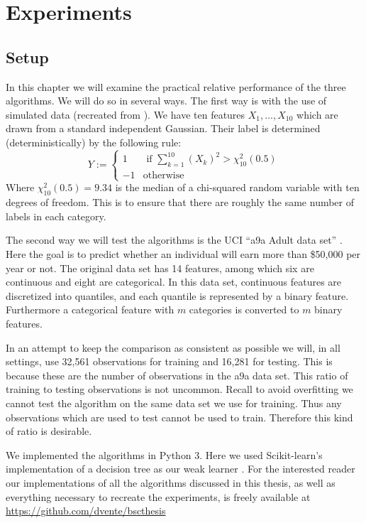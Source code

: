 
\chapter{Experiments}
\label{chap:pracPerf}
\section{Setup}
\label{sec:Setup}
In this chapter we will examine the practical relative performance of the three algorithms. We will do so in several ways. The first way is with the use of simulated data (recreated from \cite{Hastie2009}). We have ten features $X_1,\ldots,X_{10}$ which are drawn from a standard independent Gaussian. Their label is determined (deterministically) by the following rule: $$Y:=\begin{cases}
1 & \text{ if } \sum_{k=1}^{10} (X_k)^2 > \chi_{10}^2(0.5)\\
-1 & \text{otherwise}
\end{cases}$$ Where $\chi_{10}^2(0.5)=9.34$ is the median of a chi-squared random variable with ten degrees of freedom. This is to ensure that there are roughly the same number of labels in each category. 

\par The second way we will test the algorithms is the UCI ``a9a Adult data set'' \cite{LIBSVM}. Here the goal is to predict whether an individual will earn more than \$50,000 per year or not. The original data set has 14 features, among which six are continuous and eight are categorical. In this data set, continuous features are discretized into quantiles, and each quantile is represented by a binary feature. Furthermore a categorical feature with $m$ categories is converted to $m$ binary features. 

\par In an attempt to keep the comparison as consistent as possible we will, in all settings, use 32,561 observations for training and 16,281 for testing. This is because these are the number of observations in the a9a data set. This ratio of training to testing observations is not uncommon. Recall to avoid overfitting we cannot test the algorithm on the same data set we use for training. Thus any observations which are used to test cannot be used to train. Therefore this kind of ratio is desirable.

\par We implemented the algorithms in Python 3. Here we used Scikit-learn's implementation of a decision tree as our weak learner \cite{Pedregosa2012}. For the interested reader our implementations of all the algorithms discussed in this thesis, as well as everything necessary to recreate the experiments, is freely available at \url{https://github.com/dvente/bscthesis} 


